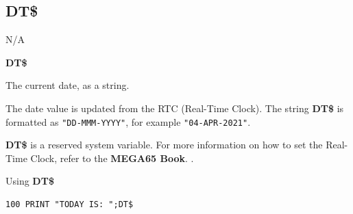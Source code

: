 \subsection{DT\$}
\begin{description}[leftmargin=2cm,style=nextline]
\item [Token:]    N/A

\item [Format:]   {\bf DT\$}

\item [Usage:]    The current date, as a string.

                  The date value is updated from the RTC (Real-Time Clock). The string {\bf DT\$} is formatted as \texttt{"DD-MMM-YYYY"}, for example \texttt{"04-APR-2021"}.

\item[Remarks:]   {\bf DT\$} is a reserved system variable. For more information on how to set the Real-Time Clock, refer to \ifdefined\printmanual
                     the {\bf MEGA65 Book}.
                  \else
                     .
                  \fi

\item [Example:]  Using {\bf DT\$}

\begin{tcolorbox}[colback=black,coltext=white]
\verbatimfont{\codefont}
\begin{verbatim}
100 PRINT "TODAY IS: ";DT$
\end{verbatim}
\end{tcolorbox}
\end{description}


\newpage
